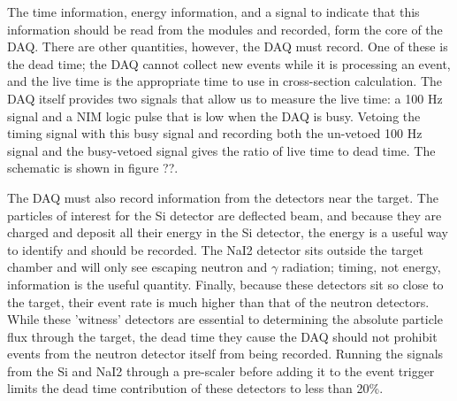 The time information, energy information, and a signal to indicate that this information should be read from the modules and recorded, form the core of the DAQ.  There are other quantities, however, the DAQ must record.  One of these is the dead time; the DAQ cannot collect new events while it is processing an event, and the live time is the appropriate time to use in cross-section calculation.  The DAQ itself provides two signals that allow us to measure the live time: a 100 Hz signal and a NIM logic pulse that is low when the DAQ is busy.  Vetoing the timing signal with this busy signal and recording both the un-vetoed 100 Hz signal and the busy-vetoed signal gives the ratio of live time to dead time.  The schematic is shown in figure ??.

The DAQ must also record information from the detectors near the target.  The particles of interest for the Si detector are deflected  beam, and because they are charged and deposit all their energy in the Si detector, the energy is a useful way to identify  and should be recorded.  The NaI2 detector sits outside the target chamber and will only see escaping neutron and $\gamma$ radiation; timing, not energy, information is the useful quantity.  Finally, because these detectors sit so close to the target, their event rate is much higher than that of the neutron detectors.  While these 'witness' detectors are essential to determining the absolute particle flux through the target, the dead time they cause the DAQ should not prohibit events from the neutron detector itself from being recorded.  Running the signals from the Si and NaI2 through a pre-scaler before adding it to the event trigger limits the dead time contribution of these detectors to less than 20\%.



%
% 
% 
